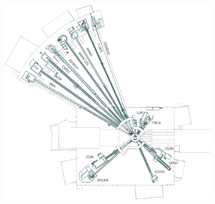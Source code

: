 \begin{figure}[!ht]
  \begin{center}
    \begin{subfigure}[t]{0.45\textwidth}
      \includegraphics[width=\textwidth]{02_BeamDiag/figures/fig000_ESS_instruments}
      \caption{}
      \label{}
    \end{subfigure}
  \end{center}
  \caption[]{}
  \label{chap3:fig:ESS_instruments}
\end{figure}
